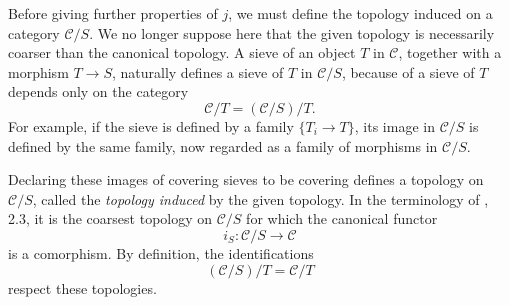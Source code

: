 Before giving further properties of \(j\), we must define the topology
induced on a category \(\mathscr C/S\). We no longer suppose here that the
given topology is necessarily coarser than the canonical topology. A sieve
of an object \(T\) in \(\mathscr C\), together with a morphism \(T\to S\),
naturally defines a sieve of \(T\) in \(\mathscr C/S\), because  of a sieve of \(T\) depends only on the category
\[
  \mathscr C/T=(\mathscr C/S)/T.
\]
For example, if the sieve is defined by a family \(\{T_i\to T\}\), its image
in \(\mathscr C/S\) is defined by the same family, now regarded as a family
of morphisms in \(\mathscr C/S\).

Declaring these images of covering sieves to be covering defines a topology
on \(\mathscr C/S\), called the \emph{topology induced} by the given
topology. In the terminology of , 2.3, it is the coarsest topology on
\(\mathscr C/S\) for which the canonical functor
\[
  i_S:\mathscr C/S\longrightarrow\mathscr C
\]
is a comorphism.
By definition, the identifications
\[
  (\mathscr C/S)/T=\mathscr C/T
\]
respect these topologies.
